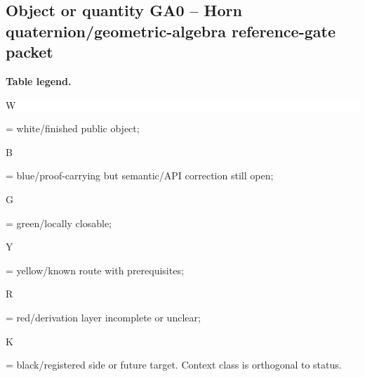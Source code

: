 \subsection*{Object or quantity GA0 -- Horn quaternion/\allowbreak{}geometric-algebra reference-gate packet}
\hypertarget{objproof:GA0}{}
\par\smallskip\noindent\begin{minipage}{0.99\linewidth}\footnotesize\raggedright\textbf{Table legend.} \colorbox{white}{\strut W} = white/finished public object; \colorbox{cyan!20}{\strut B} = blue/proof-carrying but semantic/API correction still open; \colorbox{green!18}{\strut G} = green/locally closable; \colorbox{yellow!25}{\strut Y} = yellow/known route with prerequisites; \colorbox{red!20}{\strut R} = red/derivation layer incomplete or unclear; \colorbox{black!18}{\strut K} = black/registered side or future target. Context class is orthogonal to status.\end{minipage}\par\vspace{0.25em}
